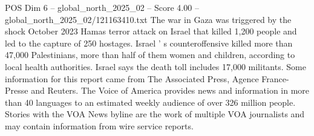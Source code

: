 \begin{textsample}{POS Dim 6 – global\_north\_2025\_02 – Score 4.00 – global\_north\_2025\_02/121163410.txt}
The war in Gaza was triggered by the shock October 2023 Hamas terror attack on Israel that killed 1,200 people and led to the capture of 250 hostages.
Israel ' s counteroffensive killed more than 47,000 Palestinians, more than half of them women and children, according to local health authorities.
Israel says the death toll includes 17,000 militants.
Some information for this report came from The Associated Press, Agence France-Presse and Reuters.
The Voice of America provides news and information in more than 40 languages to an estimated weekly audience of over 326 million people.
Stories with the VOA News byline are the work of multiple VOA journalists and may contain information from wire service reports.

\end{textsample}
